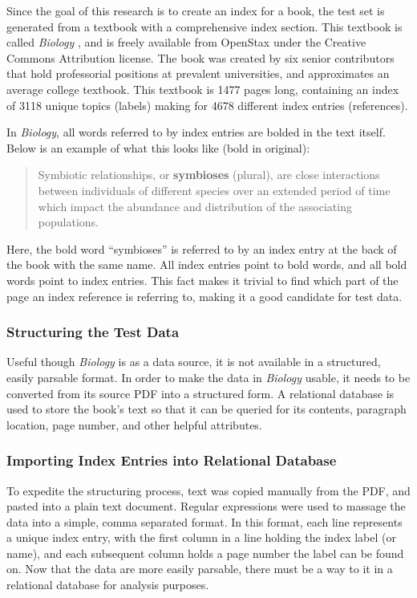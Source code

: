 Since the goal of this research is to create an index for a book, the test set is generated from a textbook with a comprehensive index section.
This textbook is called {\it Biology} \cite{biology}, and is freely available from OpenStax \cite{openstax-bio} under the Creative Commons Attribution license.
The book was created by six senior contributors that hold professorial positions at prevalent universities, and approximates an average college textbook.
This textbook is 1477 pages long, containing an index of 3118 unique topics (labels) making for 4678 different index entries (references).

In {\it Biology}, all words referred to by index entries are bolded in the text itself. Below is an example of what this looks like (bold in original):

\begin{quote}
Symbiotic relationships, or {\bf symbioses} (plural), are close interactions between individuals of different species over an extended period of time which impact the abundance and distribution of the associating populations. \cite{biology}
\end{quote}

\noindent Here, the bold word ``symbioses'' is referred to by an index entry at the back of the book with the same name. All index entries point to bold words, and all bold words point to index entries. This fact makes it trivial to find which part of the page an index reference is referring to, making it a good candidate for test data.

\subsubsection{Structuring the Test Data}

Useful though {\it Biology} is as a data source, it is not available in a structured, easily parsable format.
In order to make the data in {\it Biology} usable, it needs to be converted from its source PDF into a structured form.
A relational database is used to store the book's text so that it can be queried for its contents, paragraph location, page number, and other helpful attributes.

\subsubsection{Importing Index Entries into Relational Database}

To expedite the structuring process, text was copied manually from the PDF, and pasted into a plain text document.
Regular expressions were used to massage the data into a simple, comma separated format.
In this format, each line represents a unique index entry, with the first column in a line holding the index label (or name), and each subsequent column holds a page number the label can be found on.
Now that the data are more easily parsable, there must be a way to it in a relational database for analysis purposes.

